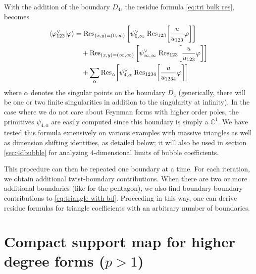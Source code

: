 \documentclass[11pt]{article}
\newcommand{\nn}{\nonumber}
\newcommand{\la}{\langle}
\newcommand{\ra}{\rangle}
\newcommand{\res}{{\rm Res}}
\newcommand{\vphi}{\varphi}
\begin{document}
With the addition of the boundary $D_4$, the residue formula \eqref{eq:tri bulk res}, becomes
\begin{align} \label{eq:triangle with bd}
	\la \vphi^\vee_{123} \vert \vphi \ra
	&= \res_{(x,y)=(0,\infty)} 
	\left[ 
		\psi_{0,\infty}^\vee\; 
		\res_{123} \bigg[\frac{u}{u_{123}}\vphi\bigg] 
	\right]
	\nn \\ & \quad 
	+ \res_{(x,y)=(\infty,\infty)} 
	\left[ 
		\psi_{\infty,\infty}^\vee\; 
		\res_{123} \bigg[\frac{u}{u_{123}}\vphi\bigg] 
	\right]
	\nn \\ & \quad 
	+ \sum_\alpha \res_\alpha 
	\bigg[ 
		\psi_{4,\alpha}^\vee \; 
		\res_{1234} \bigg[\frac{u}{u_{1234}}\vphi\bigg] 
	\bigg]
\end{align}
where $\alpha$ denotes the singular points on the boundary $D_4$ (generically, there will be one or two finite singularities in addition to the singularity at infinity). 
In the case where we do not care about Feynman forms with higher order poles, the primitives $\psi_{4,\alpha}$ are easily computed since this boundary is simply a $\mathbb{C}^1$. 
We have tested this formula extensively on various examples with massive triangles as well as dimension shifting identities, as detailed below; it will also be used in section \ref{sec:4dbubble} for analyzing 4-dimensional limits of bubble coefficients.


This procedure can then be repeated one boundary at a time. For each iteration, we obtain additional twist-boundary contributions. When there are two or more additional boundaries (like for the pentagon), we also find boundary-boundary contributions to \eqref{eq:triangle with bd}. 
Proceeding in this way, one can derive residue formulas for triangle coefficients with an arbitrary number of boundaries. 



\section{Compact support map for higher degree forms ($p>1$) \label{sec:higher form c-map}}
\end{document}
